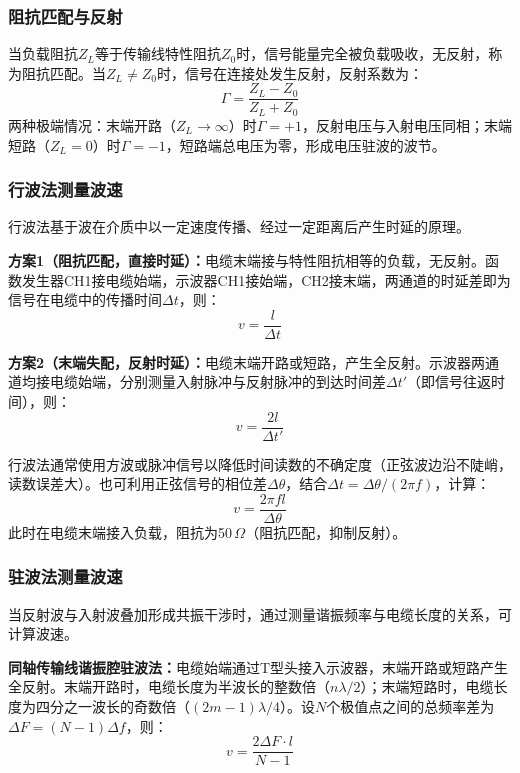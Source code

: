 \documentclass[dvipsnames, svgnames,a4paper,11pt]{article}
\begin{document}
\subsubsection{阻抗匹配与反射}

当负载阻抗$Z_L$等于传输线特性阻抗$Z_0$时，信号能量完全被负载吸收，无反射，称为阻抗匹配。当$Z_L\neq Z_0$时，信号在连接处发生反射，反射系数为：
\begin{equation}
	\Gamma = \frac{Z_L - Z_0}{Z_L + Z_0}
\end{equation}
两种极端情况：末端开路（$Z_L\to\infty$）时$\Gamma=+1$，反射电压与入射电压同相；末端短路（$Z_L=0$）时$\Gamma=-1$，短路端总电压为零，形成电压驻波的波节。

\subsubsection{行波法测量波速}

行波法基于波在介质中以一定速度传播、经过一定距离后产生时延的原理。

\textbf{方案1（阻抗匹配，直接时延）：}电缆末端接与特性阻抗相等的负载，无反射。函数发生器CH1接电缆始端，示波器CH1接始端，CH2接末端，两通道的时延差即为信号在电缆中的传播时间$\Delta t$，则：
\begin{equation}
	v = \frac{l}{\Delta t}
\end{equation}

\textbf{方案2（末端失配，反射时延）：}电缆末端开路或短路，产生全反射。示波器两通道均接电缆始端，分别测量入射脉冲与反射脉冲的到达时间差$\Delta t'$（即信号往返时间），则：
\begin{equation}
	v = \frac{2l}{\Delta t'}
\end{equation}

行波法通常使用方波或脉冲信号以降低时间读数的不确定度（正弦波边沿不陡峭，读数误差大）。也可利用正弦信号的相位差$\Delta\theta$，结合$\Delta t = \Delta\theta/(2\pi f)$，计算：
\begin{equation}
	v = \frac{2\pi f l}{\Delta\theta}
\end{equation}
此时在电缆末端接入负载，阻抗为50\,$\Omega$（阻抗匹配，抑制反射）。

\subsubsection{驻波法测量波速}

当反射波与入射波叠加形成共振干涉时，通过测量谐振频率与电缆长度的关系，可计算波速。

\textbf{同轴传输线谐振腔驻波法：}电缆始端通过T型头接入示波器，末端开路或短路产生全反射。末端开路时，电缆长度为半波长的整数倍（$n\lambda/2$）；末端短路时，电缆长度为四分之一波长的奇数倍（$(2m-1)\lambda/4$）。设$N$个极值点之间的总频率差为$\Delta F=(N-1)\Delta f$，则：
\begin{equation}
	v = \frac{2\Delta F \cdot l}{N-1}
\end{equation}
\end{document}
